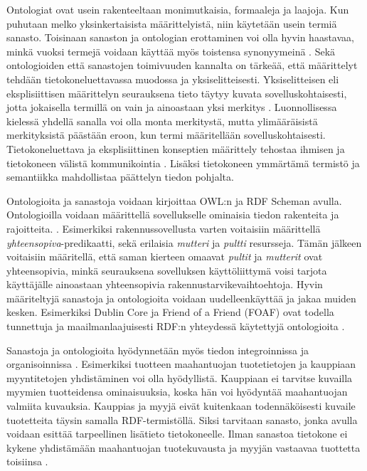 \documentclass[finnish, 12pt, a4paper, elec, utf8, pdfa, online]{aaltothesis}
\begin{document}
{Ontologiat ovat usein rakenteeltaan monimutkaisia, formaaleja ja laajoja. Kun puhutaan melko yksinkertaisista määrittelyistä, niin käytetään usein termiä sanasto. Toisinaan sanaston ja ontologian erottaminen voi olla hyvin haastavaa, minkä vuoksi termejä voidaan käyttää myös toistensa synonyymeinä \cite{vocabulary}. Sekä ontologioiden että sanastojen toimivuuden kannalta on tärkeää, että määrittelyt tehdään tietokoneluettavassa muodossa ja yksiselitteisesti. Yksiselitteisen eli eksplisiittisen määrittelyn seurauksena tieto täytyy kuvata sovelluskohtaisesti, jotta jokaisella termillä on vain ja ainoastaan yksi merkitys \cite{RDF_specification}. Luonnollisessa kielessä yhdellä sanalla voi olla monta merkitystä, mutta ylimääräisistä merkityksistä päästään eroon, kun termi määritellään sovelluskohtaisesti. Tietokoneluettava ja eksplisiittinen konseptien määrittely tehostaa ihmisen ja tietokoneen välistä kommunikointia \cite{ontology_learning}. Lisäksi tietokoneen ymmärtämä termistö ja semantiikka mahdollistaa päättelyn tiedon pohjalta.

Ontologioita ja sanastoja voidaan kirjoittaa OWL:n ja RDF Scheman avulla. Ontologioilla voidaan määrittellä sovellukselle ominaisia tiedon rakenteita ja rajoitteita. \cite{vocabulary}. Esimerkiksi rakennussovellusta varten voitaisiin määrittellä \textit{yhteensopiva}-predikaatti, sekä erilaisia \textit{mutteri} ja \textit{pultti} resursseja. Tämän jälkeen voitaisiin määritellä, että saman kierteen omaavat \textit{pultit} ja \textit{mutterit} ovat yhteensopivia, minkä seurauksena sovelluksen käyttöliittymä voisi tarjota käyttäjälle ainoastaan yhteensopivia rakennustarvikevaihtoehtoja. Hyvin määriteltyjä sanastoja ja ontologioita voidaan uudelleenkäyttää ja jakaa muiden kesken. Esimerkiksi Dublin Core ja Friend of a Friend (FOAF) ovat todella tunnettuja ja maailmanlaajuisesti RDF:n yhteydessä käytettyjä ontologioita \cite{data_namespace}.

Sanastoja ja ontologioita hyödynnetään myös tiedon integroinnissa ja organisoinnissa \cite{vocabulary}. Esimerkiksi tuotteen maahantuojan tuotetietojen ja kauppiaan myyntitetojen yhdistäminen voi olla hyödyllistä. Kauppiaan ei tarvitse kuvailla myymien tuotteidensa ominaisuuksia, koska hän voi hyödyntää maahantuojan valmiita kuvauksia. Kauppias ja myyjä eivät kuitenkaan todennäköisesti kuvaile tuotetteita täysin samalla RDF-termistöllä. Siksi tarvitaan sanasto, jonka avulla voidaan esittää tarpeellinen lisätieto tietokoneelle. Ilman sanastoa tietokone ei kykene yhdistämään maahantuojan tuotekuvausta ja myyjän vastaavaa tuottetta toisiinsa \cite{vocabulary}.


}
\end{document}
